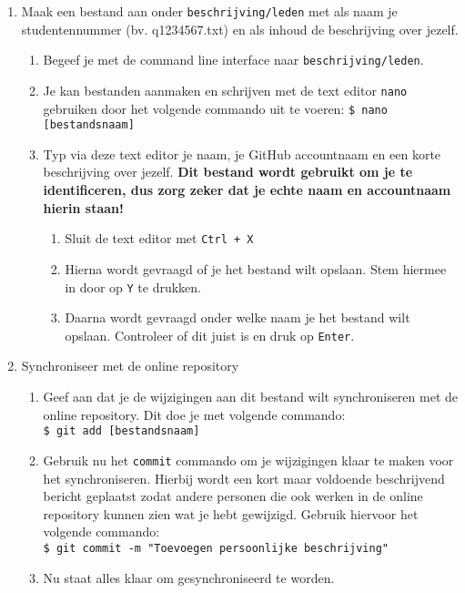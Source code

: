 \documentclass[a4paper]{article}
\begin{document}
\begin{enumerate}
    \item Maak een bestand aan onder \texttt{beschrijving/leden} met als naam je studentennummer (bv. q1234567.txt) en als inhoud de beschrijving over jezelf.
    \begin{enumerate}
        \item Begeef je met de command line interface naar \texttt{beschrijving/leden}.
        \item Je kan bestanden aanmaken en schrijven met de text editor \texttt{nano} gebruiken door het volgende commando uit te voeren:
            \texttt{\$ nano [bestandsnaam]}
        \item Typ via deze text editor je naam, je GitHub accountnaam en een korte beschrijving over jezelf.
            \textbf{Dit bestand wordt gebruikt om je te identificeren, dus zorg zeker dat je echte naam en accountnaam hierin staan!}
            \begin{enumerate}
                \item Sluit de text editor met \texttt{Ctrl + X}
                \item Hierna wordt gevraagd of je het bestand wilt opslaan.
                    Stem hiermee in door op \texttt{Y} te drukken.
                \item Daarna wordt gevraagd onder welke naam je het bestand wilt opslaan.
                    Controleer of dit juist is en druk op \texttt{Enter}.
            \end{enumerate}
    \end{enumerate}
    \item Synchroniseer met de online repository
    \begin{enumerate}
        \item Geef aan dat je de wijzigingen aan dit bestand wilt synchroniseren met de online repository.
            Dit doe je met volgende commando: \\
            \texttt{\$ git add [bestandsnaam]}
        \item Gebruik nu het \texttt{commit} commando om je wijzigingen klaar te maken voor het synchroniseren.
            Hierbij wordt een kort maar voldoende beschrijvend bericht geplaatst zodat andere personen die ook werken in de online repository kunnen zien wat je hebt gewijzigd.
            Gebruik hiervoor het volgende commando: \\
            \texttt{\$ git commit -m "Toevoegen persoonlijke beschrijving"}
        \item Nu staat alles klaar om gesynchroniseerd te worden.

\end{enumerate}
\end{enumerate}
\end{document}
